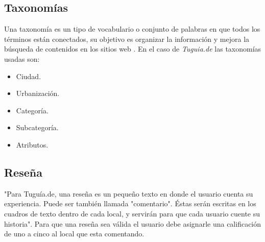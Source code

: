 \subsection{Taxonomías} \label{subsect:taxonomia}

Una taxonomía es un tipo de vocabulario o conjunto de palabras en que todos los términos están conectados, su objetivo es organizar la información y mejora la búsqueda de contenidos en los sitios web \cite{CM05}. En el caso de \textit{Tuguia.de} las taxonomías usadas son: 
\begin{itemize}
\item Ciudad.
\item Urbanización.
\item Categoría.
\item Subcategoría.
\item Atributos.
\end{itemize}

\subsection{Reseña} \label{subsect:resena}

"Para Tuguía.de, una reseña es un pequeño texto en donde el usuario cuenta su experiencia.  Puede ser también llamada "comentario". Éstas serán escritas en los cuadros de texto dentro de cada local, y servirán para que cada usuario cuente su historia"\cite{TGD}. Para que una reseña sea válida el usuario debe asignarle una calificación de uno a cinco al local que esta comentando.

 


